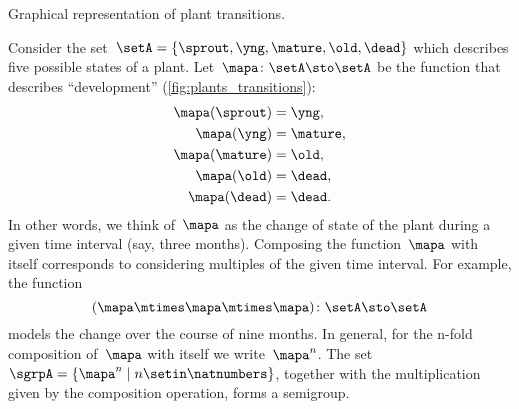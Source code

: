 \begin{marginfigure}
    \caption{Graphical representation of plant transitions.}
    \label{fig:plants_transitions}
\end{marginfigure}

\begin{example}
    \label{exa:plant-trafo-semigroup}
    Consider the set~$\setA = \{ \sprout, \yng, \mature, \old, \dead \}$ which describes five possible states of a plant.
    Let~$\mapa \colon \setA \sto \setA$ be the function that describes ``development'' (\cref{fig:plants_transitions}):
    \begin{align*}
        \mapa(\sprout) & =  \yng, \\
        \mapa(\yng)    & =  \mature, \\
        \mapa(\mature) & =  \old, \\
        \mapa( \old)   & = \dead, \\
        \mapa (\dead)  & = \dead.
    \end{align*}
    In other words, we think of~$\mapa$ as the change of state of the plant during a given time interval (say, three months).
    Composing the function~$\mapa$ with itself corresponds to considering multiples of the given time interval.
    For example, the function
    \begin{equation*}
        (\mapa \mtimes \mapa \mtimes \mapa)
        \colon \setA \sto \setA
    \end{equation*}
    models the change over the course of nine months.
    In general, for the n-fold composition of~$\mapa$ with itself we write~$\mapa^n$.
    The set~$\sgrpA = \{ \mapa^n \mid n \setin \natnumbers \}$, together with the multiplication given by the composition operation, forms a semigroup.
\end{example}
%

